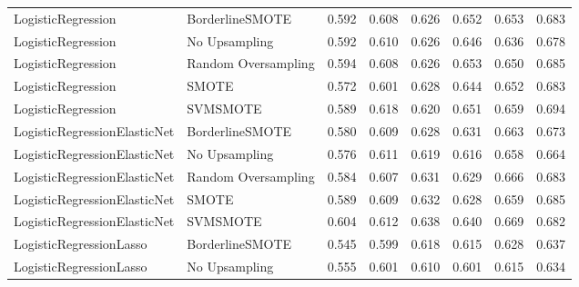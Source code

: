 \begin{tabular}{llllllll}
          LogisticRegression &     BorderlineSMOTE & 0.592 &                     0.608 &                 0.626 &                  0.652 &                                   0.653 &     0.683 \\
          LogisticRegression &       No Upsampling & 0.592 &                     0.610 &                 0.626 &                  0.646 &                                   0.636 &     0.678 \\
          LogisticRegression & Random Oversampling & 0.594 &                     0.608 &                 0.626 &                  0.653 &                                   0.650 &     0.685 \\
          LogisticRegression &               SMOTE & 0.572 &                     0.601 &                 0.628 &                  0.644 &                                   0.652 &     0.683 \\
          LogisticRegression &            SVMSMOTE & 0.589 &                     0.618 &                 0.620 &                  0.651 &                                   0.659 &     0.694 \\
LogisticRegressionElasticNet &     BorderlineSMOTE & 0.580 &                     0.609 &                 0.628 &                  0.631 &                                   0.663 &     0.673 \\
LogisticRegressionElasticNet &       No Upsampling & 0.576 &                     0.611 &                 0.619 &                  0.616 &                                   0.658 &     0.664 \\
LogisticRegressionElasticNet & Random Oversampling & 0.584 &                     0.607 &                 0.631 &                  0.629 &                                   0.666 &     0.683 \\
LogisticRegressionElasticNet &               SMOTE & 0.589 &                     0.609 &                 0.632 &                  0.628 &                                   0.659 &     0.685 \\
LogisticRegressionElasticNet &            SVMSMOTE & 0.604 &                     0.612 &                 0.638 &                  0.640 &                                   0.669 &     0.682 \\
     LogisticRegressionLasso &     BorderlineSMOTE & 0.545 &                     0.599 &                 0.618 &                  0.615 &                                   0.628 &     0.637 \\
     LogisticRegressionLasso &       No Upsampling & 0.555 &                     0.601 &                 0.610 &                  0.601 &                                   0.615 &     0.634 \\

\end{tabular}
